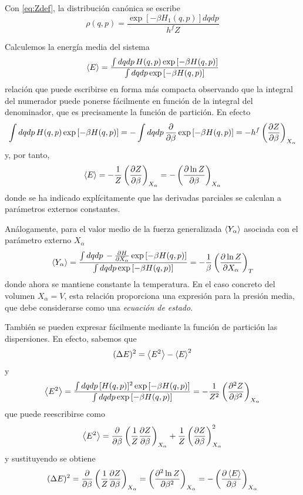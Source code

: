 Con \eqref{eq:Zdef}, la distribución canónica se escribe
\begin{equation}
	\rho(q,p) = \frac{\exp \left[ -\beta H_1(q,p) \right] dqdp}{h^f Z}
\end{equation}

Calculemos la energía media del sistema 
$$\expval{E} = \frac{\int dqdp \, H(q,p) \exp \left[ -\beta H(q,p) \right]}{\int dqdp \exp \left[ -\beta H(q,p) \right]}$$
relación que puede escribirse en forma más compacta observando que la integral del numerador puede ponerse fácilmente en función de la integral del denominador, que es precisamente la función de partición. En efecto
$$\int dqdp \, H(q,p) \exp \left[ -\beta H(q,p) \right] = - \int dqdp \, \pdv{\beta} \exp \left[ -\beta H(q,p) \right] = - h^f\left( \pdv{Z}{\beta} \right)_{X_\alpha}$$
y, por tanto,
\begin{equation}
	\expval{E} = -\frac{1}{Z} \left( \pdv{Z}{\beta} \right)_{X_\alpha} = - \left( \pdv{\ln Z}{\beta} \right)_{X_\alpha}
\end{equation}
donde se ha indicado explícitamente que las derivadas parciales se calculan a parámetros externos constantes.

Análogamente, para el valor medio de la fuerza generalizada $\expval{Y_\alpha}$ asociada con el parámetro externo $X_\alpha$
\begin{equation}
	\expval{Y_\alpha} =  \frac{\int dqdp \, -\pdv{H}{X_\alpha} \exp \left[ -\beta H(q,p) \right]}{\int dqdp \exp \left[ -\beta H(q,p) \right]} = - \frac{1}{\beta} \left( \pdv{\ln Z}{X_\alpha} \right)_{T}
\end{equation}
donde ahora se mantiene constante la temperatura.
En el caso concreto del volumen $X_\alpha = V$, esta relación proporciona una expresión para la presión media, que debe
considerarse como una \emph{ecuación de estado}.

También se pueden expresar fácilmente mediante la función de partición las dispersiones. En efecto, sabemos que
$$(\Delta E)^2 = \expval{E^2}  - \expval{E} ^2$$
y
\begin{eqnarray}
	\expval{E^2} = \frac{\int dqdp \, [H(q,p)]^2 \exp \left[ -\beta H(q,p) \right]}{\int dqdp \exp \left[ -\beta H(q,p) \right]} = -\frac{1}{Z^2} \left( \frac{\partial^2 Z}{\partial \beta^2} \right)_{X_\alpha}
\end{eqnarray}
que puede reescribirse como 
$$\expval{E^2} = \pdv{\beta} \left( \frac{1}{Z} \pdv{Z}{\beta} \right)_{X_\alpha} + \frac{1}{Z} \left( \pdv{Z}{\beta} \right)_{X_\alpha}^2$$
y sustituyendo se obtiene
\begin{equation}
	(\Delta E)^2 = \pdv{\beta} \left( \frac{1}{Z} \pdv{Z}{\beta} \right)_{X_\alpha} = \left( \pdv[2]{\ln Z}{\beta} \right)_{X_\alpha} = - \left( \pdv{\expval{E}}{\beta} \right)_{X_\alpha}
\end{equation}

